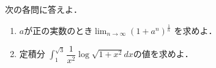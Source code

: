 \documentclass[../../main.tex]{subfiles}
\begin{document}
次の各問に答えよ．
\begin{enumerate}
  \item $a$が正の実数のとき$\displaystyle\lim_{n \to \infty}{(1+a^n)}^{\frac{1}{n}}$
    を求めよ．
  \item 定積分
    $\displaystyle\int_1^{\sqrt3}\displaystyle\dfrac{1}{x^2}\log\sqrt{1+x^2}dx$の値を求めよ．
\end{enumerate}
\end{document}
